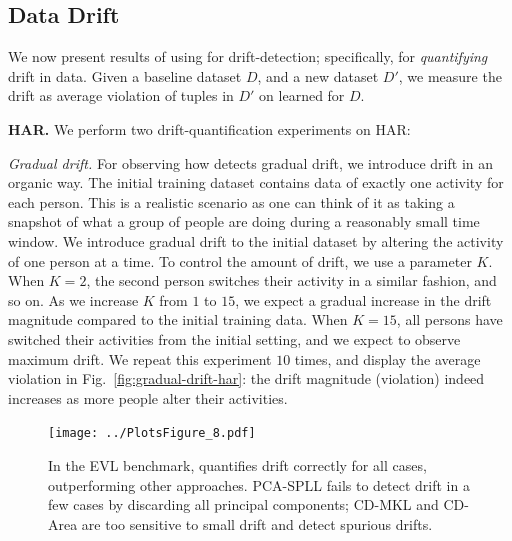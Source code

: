 \smallskip

\subsection{Data Drift}\label{exp-invariants-for-drift}
%
We now present results of using \dis for drift-detection; specifically, for
\emph{quantifying} drift in data. Given a baseline dataset $D$, and a new
dataset $D'$, we measure the drift as average violation of tuples in $D'$ on
\dis learned for $D$.

\smallskip

\noindent\textbf{HAR.} We perform two drift-quantification experiments on
HAR:

\smallskip

\noindent \emph{Gradual drift.}  For observing how \system detects
gradual drift, we introduce drift in an organic way. The initial training
dataset contains data of exactly one activity for each person. This is a
realistic scenario as one can think of it as taking a snapshot of what a group
of people are doing during a reasonably small time window. We introduce gradual
drift to the initial dataset by altering the activity of one person at a time.
To control the amount of drift, we use a parameter $K$.  When $K = 2$, the
second person switches their activity in a similar fashion, and so on. As we
increase $K$ from $1$ to $15$, we expect a gradual increase in the drift
magnitude compared to the initial training data. When $K = 15$, all persons
have switched their activities from the initial setting, and we expect to
observe maximum drift. We repeat this experiment $10$ times, and display the
average \invariant violation in Fig.~\ref{fig:gradual-drift-har}: the drift
magnitude (violation) indeed increases as more people alter their activities.

\begin{figure}[t]
	\centering	
	\texttt{[image: ../PlotsFigure\_8.pdf]}	
		\vspace{-5mm}
	 \caption{In the EVL benchmark, \system quantifies drift correctly for all
	 cases, outperforming other approaches. PCA-SPLL fails to detect drift in a few cases by
 	 discarding all principal components; CD-MKL and CD-Area are too sensitive to
 	 small drift and detect spurious drifts.}
	\vspace{-2mm}
	\label{fig:drift-baseline-comparison-EVL}
\end{figure}

